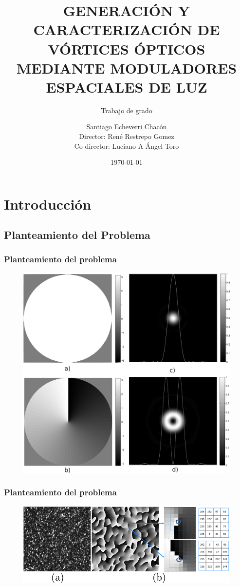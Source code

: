 \documentclass[xcolor=table,serif]{beamer}
\date{\today}
\author[]{Santiago Echeverri Chac\'on\\ Director: René Restrepo
  Gomez\\Co-director: Luciano A Ángel Toro}
\title[Trabajo de grado]{GENERACIÓN Y CARACTERIZACIÓN DE VÓRTICES
                  ÓPTICOS MEDIANTE MODULADORES ESPACIALES DE LUZ}
\subtitle{Trabajo de grado}
\institute{Universidad EAFIT}
\begin{document}
\begin{frame}
\titlepage
\end{frame}
\AtBeginSection[]
{
 \begin{frame}
   \frametitle{Contenido}
   \footnotesize 
   \tableofcontents[currentsection]%
   \normalsize
\end{frame}
}

\section{Introducción}
\subsection{Planteamiento del Problema}
\begin{frame}
\frametitle{Planteamiento del problema}
\begin{figure}
  \includegraphics[scale = 0.3]{Figures/ch2_img/oam_Intro.pdf}
  \end{figure}
\end{frame}
\addtocounter{framenumber}{-1}
\begin{frame}
\frametitle{Planteamiento del problema}
\begin{figure}
  \includegraphics[scale = 0.6]{Figures/presentation/speckle_vo.pdf}
  \end{figure}
\end{frame}
\end{document}
